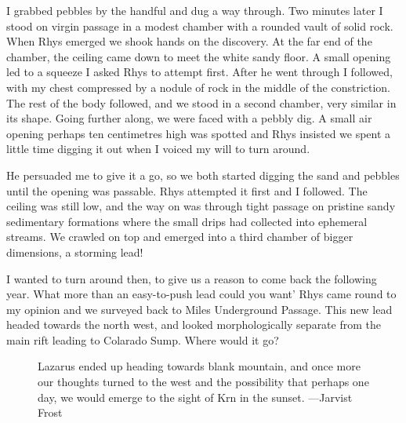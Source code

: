 I grabbed pebbles by the handful and dug a way through. Two minutes later I stood on virgin passage in a modest chamber with a rounded vault of solid rock. When Rhys emerged we shook hands on the discovery. At the far end of the chamber, the ceiling came down to meet the white sandy floor. A small opening led to a squeeze I asked Rhys to attempt first. After he went through I followed, with my chest compressed by a nodule of rock in the middle of the constriction. The rest of the body followed, and we stood in a second chamber, very similar in its shape. Going further along, we were faced with a pebbly dig. A small air opening perhaps ten centimetres high was spotted and Rhys insisted we spent a little time digging it out when I voiced my will to turn around. 

He persuaded me to give it a go, so we both started digging the sand and pebbles until the opening was passable. Rhys attempted it first and I followed. The ceiling was still low, and the way on was through tight passage on pristine sandy sedimentary formations where the small drips had collected into ephemeral streams. We crawled on top and emerged into a third chamber of bigger dimensions, a storming lead! 

I wanted to turn around then, to give us a reason to come back the following year. What more than an easy-to-push lead could you want' Rhys came round to my opinion and we surveyed back to Miles Underground Passage. This new lead headed towards the north west, and looked morphologically separate from the main rift leading to Colarado Sump. Where would it go?


\begin{figure*}[b!]
\checkoddpage \ifoddpage \forcerectofloat \else \forceversofloat \fi
\centering
 \caption{Lazarus ended up heading towards blank mountain, and once more our thoughts turned to the west and the possibility that perhaps one day, we would emerge to the sight of Krn in the sunset. ---Jarvist Frost}
 \label{jarv sunset}
\end{figure*}


